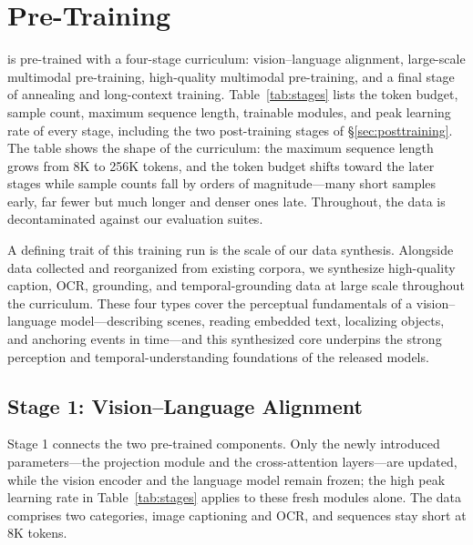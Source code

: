 \section{Pre-Training}\label{sec:pretraining}

\begin{table}[t]
  \centering
  \caption{The \mossvl{} training curriculum: four pre-training stages
  followed by SFT and Realtime-SFT (\S\ref{sec:posttraining}). The data
  of each stage is described in the corresponding subsection. Token
  counts are the tokens fed to the language model, with vision tokens
  counted after the $2{\times}2$ token compression of the projection
  module (\S\ref{sec:architecture}); sequence lengths are in tokens.}
  \label{tab:stages}
  
\end{table}


\mossvl{} is pre-trained with a four-stage curriculum: vision--language
alignment, large-scale multimodal pre-training, high-quality multimodal
pre-training, and a final stage of annealing and long-context training.
Table~\ref{tab:stages} lists the token budget, sample count, maximum
sequence length, trainable modules, and peak learning rate of every
stage, including the two post-training stages of
\S\ref{sec:posttraining}. The table shows the shape of the
curriculum: the maximum sequence length grows from 8K to 256K tokens,
and the token budget shifts toward the later stages while sample counts
fall by orders of magnitude---many short samples early, far fewer but
much longer and denser ones late. Throughout, the data is
decontaminated against our evaluation suites.

A defining trait of this training run is the scale of our data
synthesis. Alongside data collected and reorganized from existing
corpora, we synthesize high-quality caption, OCR, grounding, and
temporal-grounding data at large scale throughout the curriculum. These
four types cover the perceptual fundamentals of a vision--language
model---describing scenes, reading embedded text, localizing objects,
and anchoring events in time---and this synthesized core underpins the
strong perception and temporal-understanding foundations of the
released models.

\subsection{Stage 1: Vision--Language Alignment}\label{sec:pt-align}

Stage 1 connects the two pre-trained components. Only the newly
introduced parameters---the projection module and the cross-attention
layers---are updated, while the vision encoder and the language model
remain frozen; the high peak learning rate in Table~\ref{tab:stages}
applies to these fresh modules alone. The data comprises two
categories, image captioning and OCR, and sequences stay short at 8K
tokens.

